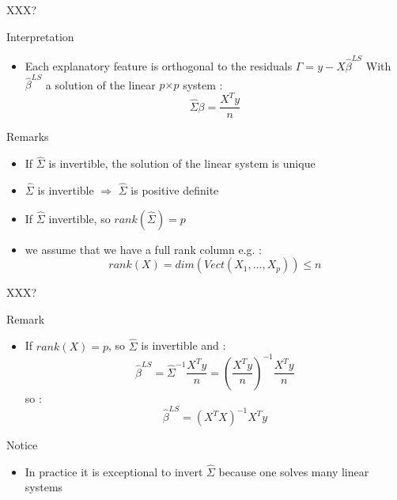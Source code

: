 \documentclass[unknownkeysallowed]{beamer}
\begin{document}
\begin{frame}{XXX?} %
\begin{alertblock}{Interpretation}
    \begin{itemize}
        \item  Each explanatory feature is orthogonal to the residuals $\Gamma=y-X\hat{\beta}^{LS}$ With $\hat{\beta}^{LS}$ a solution of the linear $p$$\times$$p$ system : $$ \hat{\Sigma}\beta= \frac{X^T y}{n}  $$

    \end{itemize}
\end{alertblock}


\begin{block}{Remarks}
    \begin{itemize}
        \item  If $\hat{\Sigma}$ is invertible, the solution of the linear system is unique
        \item $\hat{\Sigma}$ is invertible $\Rightarrow$ $\hat{\Sigma}$ is positive definite
        \item If $\hat{\Sigma}$ invertible, so $rank(\hat{\Sigma})=p$
        \item we assume that we have a full rank column e.g. : $$rank(X)=dim(Vect(X_1,\dots,X_p)) \leq n $$

    \end{itemize}
\end{block}
\end{frame}


\begin{frame}{XXX?} %

\begin{alertblock}{Remark}
    \begin{itemize}
        \item  If $rank(X)=p$, so $\hat{\Sigma}$ is invertible and : $$\hat{\beta}^{LS}=\hat{\Sigma}^{-1}\frac{X^T y}{n}=(\frac{X^T y}{n})^{-1} \frac{X^T y}{n}$$
       so :  $$ \hat{\beta}^{LS}=(X^TX)^{-1}X^Ty$$

    \end{itemize}


\end{alertblock}

\begin{block}{Notice}
    \begin{itemize}
        \item  In practice it is exceptional to invert $\hat{\Sigma} $ because one solves many linear systems

    \end{itemize}


\end{block}
\end{frame}
\end{document}
